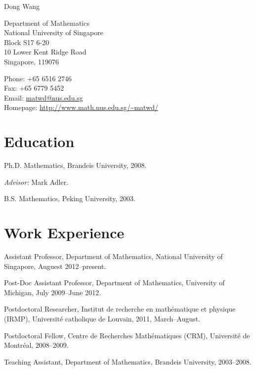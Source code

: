 \documentclass[12pt,a4paper]{article}
\def\name{Dong Wang}
\newenvironment{item_list}{
 \begin{list}{}{
   \setlength{\leftmargin}{1.5em}
   \setlength{\itemsep}{0.25em}
   \setlength{\parskip}{0pt}
   \setlength{\parsep}{0.25em}
 }
}{
 \end{list}
}
\begin{document}
{\huge \name}


\bigskip

\begin{minipage}[t]{0.5\textwidth}
  Department of Mathematics \\
  National University of Singapore \\
  Block S17 6-20 \\
  10 Lower Kent Ridge Road \\
  Singapore, 119076
\end{minipage}
\begin{minipage}[t]{0.5\textwidth}
  Phone: +65 6516 2746 \\
  Fax: +65 6779 5452 \\
  Email: \href{mailto:matwd@nus.edu.sg}{matwd@nus.edu.sg} \\
  Homepage: \href{http://www.math.nus.edu.sg/~matwd/}{\url{http://www.math.nus.edu.sg/~matwd/}}
\end{minipage}

\section*{Education}

\begin{item_list}
  \item Ph.D. Mathematics, Brandeis University, 2008.
    \begin{item_list}
    \item \textit{Advisor:}
      Mark Adler.
    \end{item_list}
  \item B.S. Mathematics, %
    Peking University, 2003.
\end{item_list}

\section*{Work Experience}

\begin{item_list}
\item Assistant Professor, Department of Mathematics, National University of Singapore, Auguest 2012--present.
\item Post-Doc Assistant Professor, Department of Mathematics, University of Michigan,
  July 2009--June 2012.
\item Postdoctoral Researcher, Institut de recherche en math\'{e}matique et physique (IRMP), Universit\'{e} catholique de Louvain, 2011, March--August.
\item Postdoctoral Fellow, Centre de Recherches Math\'{e}matiques (CRM), Universit\'{e} de Montr\'{e}al, 2008--2009.
\item Teaching Assistant, Department of Mathematics, Brandeis University, 2003--2008.
\end{item_list}
\end{document}
